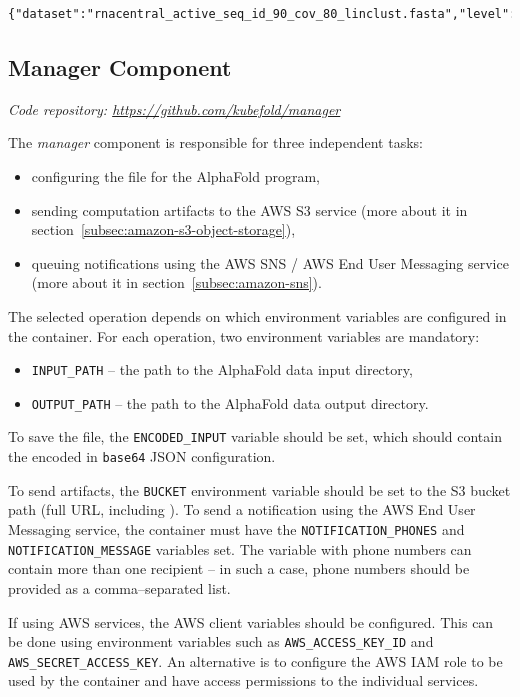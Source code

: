 \begin{lstlisting}[language=txt,caption={Sample logline from downloader},label={lst:downloader_logline}]
{"dataset":"rnacentral_active_seq_id_90_cov_80_linclust.fasta","level":"info","msg":"Download progress","size":7700349721,"time":"2025-05-17T16:53:52+02:00","total":13860314914,"type":"download","unit":"bytes"}
\end{lstlisting}

\subsection{Manager Component}\label{subsec:component-manager}
\textit{Code repository: \url{https://github.com/kubefold/manager}}

The \textit{manager} component is responsible for three independent tasks:
\begin{itemize}
    \item configuring the  file for the AlphaFold program,
    \item sending computation artifacts to the AWS S3 service (more about it in section~\ref{subsec:amazon-s3-object-storage}),
    \item queuing notifications using the AWS SNS / AWS End User Messaging service (more about it in section~\ref{subsec:amazon-sns}).
\end{itemize}

The selected operation depends on which environment variables are configured in the container.
For each operation, two environment variables are mandatory:
\begin{itemize}
    \item \texttt{INPUT\_PATH} -- the path to the AlphaFold data input directory,
    \item \texttt{OUTPUT\_PATH} -- the path to the AlphaFold data output directory.
\end{itemize}

To save the  file, the \texttt{ENCODED\_INPUT} variable should be set, which should contain the encoded in \texttt{base64} JSON configuration.

To send artifacts, the \texttt{BUCKET} environment variable should be set to the S3 bucket path (full URL, including ).
To send a notification using the AWS End User Messaging service, the container must have the \texttt{NOTIFICATION\_PHONES} and \texttt{NOTIFICATION\_MESSAGE} variables set.
The variable with phone numbers can contain more than one recipient -- in such a case, phone numbers should be provided as a comma--separated list.

If using AWS services, the AWS client variables should be configured.
This can be done using environment variables such as \texttt{AWS\_ACCESS\_KEY\_ID} and \texttt{AWS\_SECRET\_ACCESS\_KEY}.
An alternative is to configure the AWS IAM role to be used by the container and have access permissions to the individual services.